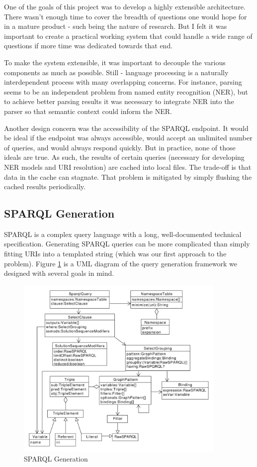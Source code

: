 \documentclass[11pt]{article}
\begin{document}
One of the goals of this project was to develop a
highly extensible architecture. There wasn't enough time to cover the
breadth of questions one would hope for in a mature product - such being
the nature of research. But I felt it was important to create a practical
working system that could handle a wide range of questions if more
time was dedicated towards that end.

To make the system extensible, it was important to decouple the various
components as much as possible. Still - language processing is a naturally
interdependent process with many overlapping concerns. For instance,
parsing seems to be an independent problem from named entity recognition (NER),
but to achieve better parsing results it was necessary to integrate NER into the
parser so that semantic context could inform the NER. 

Another design concern was the accessibility of the SPARQL endpoint.
It would be ideal if the endpoint was always accessible, would accept an unlimited
number of queries, and would always respond quickly. But in practice, none of
those ideals are true. As such, the results of certain queries
(necessary for developing NER models and URI resolution) are cached into local files.
The trade-off is that data in the cache can stagnate. That problem is mitigated by 
simply flushing the cached results periodically.

\subsection{SPARQL Generation}
\label{section:sparql_gen}
SPARQL is a complex query language with a long, well-documented 
technical specification\cite{sparql, sparql11}. Generating SPARQL queries can be
more complicated than simply fitting URIs into a templated string (which was our
first approach to the problem). Figure \ref{fig:sparql_gen} is a UML diagram of the
query generation framework we designed with several goals in mind. 

\begin{figure}[h!]
    \centering
    \includegraphics[width=0.9\textwidth,natwidth=1,natheight=1]{umlet/sparql.pdf}
    \caption{SPARQL Generation \cite{sparql, sparql11}}
    \label{fig:sparql_gen}
\end{figure}
\end{document}

